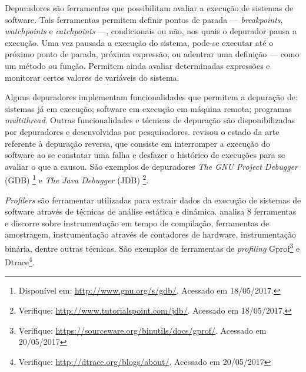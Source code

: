 
Depuradores são ferramentas que possibilitam avaliar a execução de sistemas de
software. Tais ferramentas permitem definir pontos de parada ---
\textit{breakpoints}, \textit{watchpoints} e \textit{catchpoints} ---,
condicionais ou não, nos quais o depurador pausa a execução. Uma vez pausada a
execução do sistema, pode-se executar até o próximo ponto de parada, próxima
expressão, ou adentrar uma definição --- como um método ou função. Permitem ainda
avaliar determinadas expressões e monitorar certos valores de variáveis do
sistema.

Alguns depuradores implementam funcionalidades que permitem a depuração de:
sistemas já em execução; software em execução em máquina remota; programas
\textit{multithread}. Outras funcionalidades e técnicas de depuração são
disponibilizadas por depuradores e desenvolvidas por pesquisadores.
 revisou o estado da arte referente à
depuração reversa, que consiste em interromper a execução do software ao se
constatar uma falha e desfazer o histórico de execuções para se avaliar o que a
causou.
São exemplos de depuradores \textit{The GNU Project Debugger} (GDB)
\footnote{Disponível em: \href{http://www.gnu.org/s/gdb/}{http://www.gnu.org/s/gdb/}. Acessado em 18/05/2017.} e 
\textit{The Java Debugger} (JDB)
\footnote{Verifique: \href{http://www.tutorialspoint.com/jdb/}{http://www.tutorialspoint.com/jdb/}. Acessado em 18/05/2017.}.


\textit{Profilers} são ferramentar utilizadas para extrair dados da execução de
sistemas de software através de técnicas de análise estática e dinâmica.
 analisa 8 ferramentas e discorre sobre
instrumentação em tempo de compilação, ferramentas de amostragem, instrumentação
através de contadores de hardware, instrumentação binária, dentre outras
técnicas.
São exemplos de ferramentas de \textit{profiling} Gprof\footnote{Verifique: \href{https://sourceware.org/binutils/docs/gprof/}{https://sourceware.org/binutils/docs/gprof/}. Acessado em 20/05/2017}
e Dtrace\footnote{Verifique: \href{http://dtrace.org/blogs/about/}{http://dtrace.org/blogs/about/}. Acessado em 20/05/2017}.

